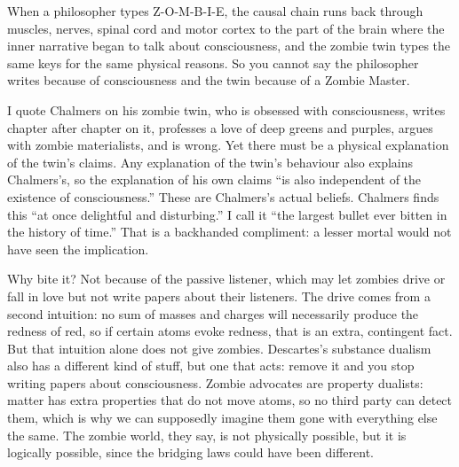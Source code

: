 When a philosopher types Z-O-M-B-I-E, the causal chain runs back through muscles, nerves, spinal cord and motor cortex to the part of the brain where the inner narrative began to talk about consciousness, and the zombie twin types the same keys for the same physical reasons. So you cannot say the philosopher writes because of consciousness and the twin because of a Zombie Master.

I quote Chalmers on his zombie twin, who is obsessed with consciousness, writes chapter after chapter on it, professes a love of deep greens and purples, argues with zombie materialists, and is wrong. Yet there must be a physical explanation of the twin's claims. Any explanation of the twin's behaviour also explains Chalmers's, so the explanation of his own claims ``is also independent of the existence of consciousness.'' These are Chalmers's actual beliefs. Chalmers finds this ``at once delightful and disturbing.'' I call it ``the largest bullet ever bitten in the history of time.'' That is a backhanded compliment: a lesser mortal would not have seen the implication.

Why bite it? Not because of the passive listener, which may let zombies drive or fall in love but not write papers about their listeners. The drive comes from a second intuition: no sum of masses and charges will necessarily produce the redness of red, so if certain atoms evoke redness, that is an extra, contingent fact. But that intuition alone does not give zombies. Descartes's substance dualism also has a different kind of stuff, but one that acts: remove it and you stop writing papers about consciousness. Zombie advocates are property dualists: matter has extra properties that do not move atoms, so no third party can detect them, which is why we can supposedly imagine them gone with everything else the same. The zombie world, they say, is not physically possible, but it is logically possible, since the bridging laws could have been different.

